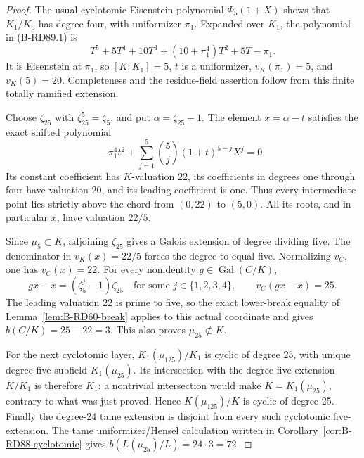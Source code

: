 \begin{proof}
The usual cyclotomic Eisenstein polynomial
\(\Phi_5(1+X)\) shows that \(K_1/K_0\) has degree four,
with uniformizer \(\pi_1\). Expanded over \(K_1\), the
polynomial in (B-RD89.1) is
\[
 T^5+5T^4+10T^3+(10+\pi_1^4)T^2+5T-\pi_1.
                                                        \tag{B-RD89.2}
\]
It is Eisenstein at \(\pi_1\), so \([K:K_1]=5\),
\(t\) is a uniformizer, \(v_K(\pi_1)=5\), and
\(v_K(5)=20\). Completeness and the residue-field assertion
follow from this finite totally ramified extension.

Choose \(\zeta_{25}\) with \(\zeta_{25}^5=\zeta_5\),
and put \(\alpha=\zeta_{25}-1\). The element
\(x=\alpha-t\) satisfies the exact shifted polynomial
\[
 -\pi_1^4t^2+
 \sum_{j=1}^5\binom5j(1+t)^{5-j}X^j=0.               \tag{B-RD89.3}
\]
Its constant coefficient has \(K\)-valuation 22,
its coefficients in degrees one through four have
valuation 20, and its leading coefficient is one.
Thus every intermediate point lies strictly above
the chord from \((0,22)\) to \((5,0)\). All its roots,
and in particular \(x\), have valuation \(22/5\).

Since \(\mu_5\subset K\), adjoining \(\zeta_{25}\)
gives a Galois extension of degree dividing five.
The denominator in \(v_K(x)=22/5\) forces the degree
to equal five. Normalizing \(v_C\), one has
\(v_C(x)=22\). For every nonidentity
\(g\in\operatorname{Gal}(C/K)\),
\[
  gx-x=(\zeta_5^j-1)\zeta_{25}
       \quad\text{for some }j\in\{1,2,3,4\},
  \qquad v_C(gx-x)=25.                               \tag{B-RD89.4}
\]
The leading valuation 22 is prime to five, so the
exact lower-break equality of
Lemma~\ref{lem:B-RD60-break} applies to this actual
coordinate and gives \(b(C/K)=25-22=3\).
This also proves \(\mu_{25}\not\subset K\).

For the next cyclotomic layer,
\(K_1(\mu_{125})/K_1\) is cyclic of degree 25,
with unique degree-five subfield \(K_1(\mu_{25})\).
Its intersection with the degree-five extension
\(K/K_1\) is therefore \(K_1\): a nontrivial intersection
would make \(K=K_1(\mu_{25})\), contrary to what was
just proved. Hence \(K(\mu_{125})/K\) is cyclic of
degree 25. Finally the degree-24 tame extension is
disjoint from every such cyclotomic five-extension.
The tame uniformizer/Hensel calculation written in
Corollary~\ref{cor:B-RD88-cyclotomic} gives
\(b(L(\mu_{25})/L)=24\cdot3=72\).
\end{proof}

